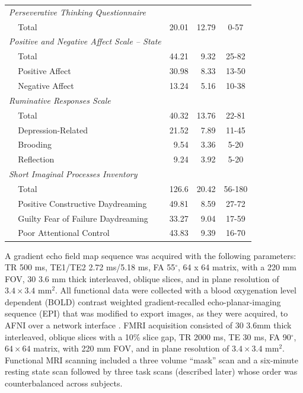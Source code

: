 \begin{table}[h!]
\begin{tabular}{ llrrc }
        \multicolumn{2}{l}{\emph{Perseverative Thinking Questionnaire}} &&& \\
        & Total & 20.01 & 12.79 & 0-57 \\
        \multicolumn{2}{l}{\emph{Positive and Negative Affect Scale – State}} & & & \\
        & Total & 44.21 & 9.32 & 25-82 \\
        & Positive Affect & 30.98 & 8.33 & 13-50 \\
        & Negative Affect & 13.24 & 5.16 & 10-38 \\
        \multicolumn{2}{l}{\emph{Ruminative Responses Scale}} & & & \\
        & Total & 40.32 & 13.76 & 22-81 \\
        & Depression-Related & 21.52 & 7.89 & 11-45 \\
        & Brooding & 9.54 & 3.36 & 5-20 \\
        & Reflection & 9.24 & 3.92 & 5-20 \\
        \multicolumn{2}{l}{\emph{Short Imaginal Processes Inventory}} &&& \\
        & Total & 126.6 & 20.42 & 56-180 \\
        & Positive Constructive Daydreaming & 49.81 & 8.59 & 27-72 \\
        & Guilty Fear of Failure Daydreaming & 33.27 & 9.04 & 17-59 \\
        & Poor Attentional Control & 43.83 & 9.39 & 16-70 \\
      \end{tabular}
\label{table:assessments}
\end{table}

A gradient echo field map sequence was acquired with the following parameters: TR 500 ms, TE1/TE2 2.72 ms/5.18 ms, FA 55$^\circ$, 64 x 64 matrix, with a 220 mm FOV, 30 3.6 mm thick interleaved, oblique slices, and in plane resolution of $3.4 \times 3.4$ mm$^2$. All functional data were collected with a blood oxygenation level dependent (BOLD) contrast weighted gradient-recalled echo-planar-imaging sequence (EPI) that was modified to export images, as they were acquired, to AFNI over a network interface \cite{Cox1995,LaConte2007}. FMRI acquisition consisted of 30 3.6mm thick interleaved, oblique slices with a 10\% slice gap, TR 2000 ms, TE 30 ms, FA 90$^\circ$, $64 \times 64$ matrix, with 220 mm FOV, and in plane resolution of $3.4 \times 3.4$ mm$^2$. Functional MRI scanning included a three volume “mask” scan and a six-minute resting state scan followed by three task scans (described later) whose order was counterbalanced across subjects.

